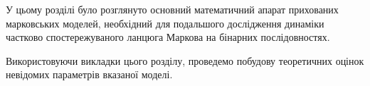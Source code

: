 \chapconclude{\ref{chap: review}}

У цьому розділі було розглянуто основний математичний апарат прихованих марковських моделей, необхідний для подальшого дослідження динаміки частково спостережуваного ланцюга Маркова на бінарних послідовностях.

Використовуючи викладки цього розділу, проведемо побудову теоретичних оцінок невідомих параметрів вказаної моделі.
